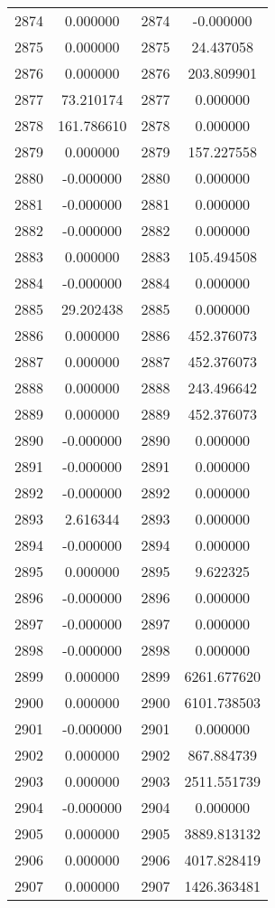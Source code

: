 \documentclass[12pt]{article}
\begin{document}
\begin{longtable}{@{}cccc@{}}
2874 & 0.000000 & 2874 & -0.000000 \\
2875 & 0.000000 & 2875 & 24.437058 \\
2876 & 0.000000 & 2876 & 203.809901 \\
2877 & 73.210174 & 2877 & 0.000000 \\
2878 & 161.786610 & 2878 & 0.000000 \\
2879 & 0.000000 & 2879 & 157.227558 \\
2880 & -0.000000 & 2880 & 0.000000 \\
2881 & -0.000000 & 2881 & 0.000000 \\
2882 & -0.000000 & 2882 & 0.000000 \\
2883 & 0.000000 & 2883 & 105.494508 \\
2884 & -0.000000 & 2884 & 0.000000 \\
2885 & 29.202438 & 2885 & 0.000000 \\
2886 & 0.000000 & 2886 & 452.376073 \\
2887 & 0.000000 & 2887 & 452.376073 \\
2888 & 0.000000 & 2888 & 243.496642 \\
2889 & 0.000000 & 2889 & 452.376073 \\
2890 & -0.000000 & 2890 & 0.000000 \\
2891 & -0.000000 & 2891 & 0.000000 \\
2892 & -0.000000 & 2892 & 0.000000 \\
2893 & 2.616344 & 2893 & 0.000000 \\
2894 & -0.000000 & 2894 & 0.000000 \\
2895 & 0.000000 & 2895 & 9.622325 \\
2896 & -0.000000 & 2896 & 0.000000 \\
2897 & -0.000000 & 2897 & 0.000000 \\
2898 & -0.000000 & 2898 & 0.000000 \\
2899 & 0.000000 & 2899 & 6261.677620 \\
2900 & 0.000000 & 2900 & 6101.738503 \\
2901 & -0.000000 & 2901 & 0.000000 \\
2902 & 0.000000 & 2902 & 867.884739 \\
2903 & 0.000000 & 2903 & 2511.551739 \\
2904 & -0.000000 & 2904 & 0.000000 \\
2905 & 0.000000 & 2905 & 3889.813132 \\
2906 & 0.000000 & 2906 & 4017.828419 \\
2907 & 0.000000 & 2907 & 1426.363481 \\

\end{longtable}
\end{document}
